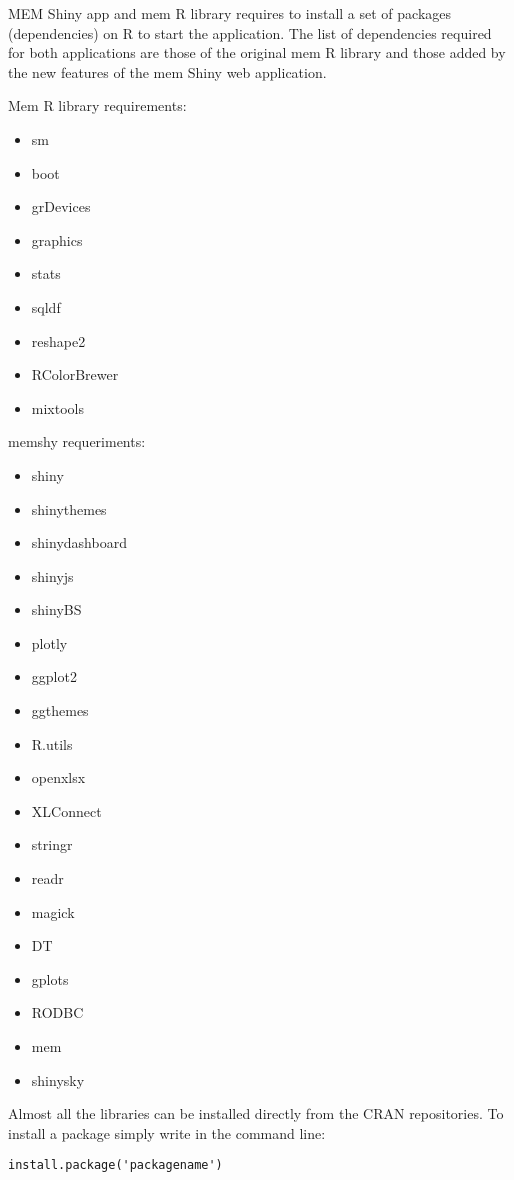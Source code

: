 \documentclass[10pt,a4paper]{memoir}
\begin{document}
MEM Shiny app and mem R library requires to install a set of packages (dependencies) on R to start the application. The list of dependencies required for both applications are those of the original mem R library and those added by the new features of the mem Shiny web application.

Mem R library requirements:

\begin{itemize}[\textbullet]
\item sm
\item boot
\item grDevices
\item graphics
\item stats
\item sqldf
\item reshape2
\item RColorBrewer
\item mixtools
\end{itemize}

memshy requeriments:

\begin{itemize}[\textbullet]
\item shiny
\item shinythemes
\item shinydashboard
\item shinyjs
\item shinyBS
\item plotly
\item ggplot2
\item ggthemes
\item R.utils
\item openxlsx
\item XLConnect
\item stringr
\item readr
\item magick
\item DT
\item gplots
\item RODBC
\item mem
\item shinysky
\end{itemize}

Almost all the libraries can be installed directly from the CRAN repositories. To install a package simply write in the command line:

\begin{lstlisting}
install.package('packagename')
\end{lstlisting}
\end{document}
